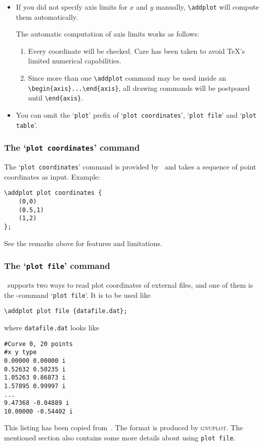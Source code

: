\begin{itemize}
	\item If you did not specify axis limits for $x$ and $y$ manually, \lstinline!\addplot! will compute them automatically. 

	The automatic computation of axis limits works as follows:
		\begin{enumerate}
			\item Every coordinate will be checked. Care has been taken to avoid \TeX's limited numerical capabilities.
			\item Since more than one \lstinline!\addplot! command may be used inside an \lstinline!\begin{axis}...\end{axis}!, all drawing commands will be postponed until \lstinline!\end{axis}!.
		\end{enumerate}

	\item You can omit the `\texttt{plot}' prefix of `\texttt{plot coordinates}', `\texttt{plot file}' and `\texttt{plot table}'.
\end{itemize}

\subsubsection{The `\texttt{plot coordinates}' command}
The `\texttt{plot coordinates}' command is provided by \Tikz\ and takes a sequence of point coordinates as input. Example:
\begin{lstlisting}
\addplot plot coordinates {
	(0,0)
	(0.5,1)
	(1,2)
};
\end{lstlisting}
See the remarks above for features and limitations.

\subsubsection{The `\texttt{plot file}' command}
\PGFPlots\ supports two ways to read plot coordinates of external files, and one of them is the \Tikz-command `\texttt{plot file}'. It is to be used like
\begin{lstlisting}
\addplot plot file {datafile.dat};
\end{lstlisting}
where \texttt{datafile.dat} looks like
\begin{lstlisting}
#Curve 0, 20 points
#x y type
0.00000 0.00000 i
0.52632 0.50235 i
1.05263 0.86873 i
1.57895 0.99997 i
...
9.47368 -0.04889 i
10.00000 -0.54402 i
\end{lstlisting}
This listing has been copied from~\cite[section~16.4]{tikz}. The format is produced by \textsc{gnuplot}. The mentioned section also contains some more details about using \texttt{plot file}.


